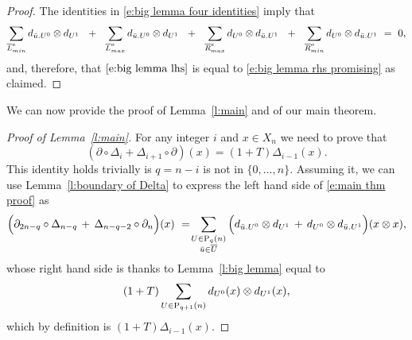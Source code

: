 \begin{proof}
	The identities in \eqref{e:big lemma four identities} imply that
	\begin{equation} \label{e:big lemma zero sum}
	\sum_{\overline{L}_{min}^{e}} d_{\bu.U^0} \otimes d_{U^1}\ \ +\ \
	\sum_{\overline{L}_{max}^{o}} d_{\bu.U^0} \otimes d_{U^1}\ \ +\ \
	\sum_{\overline{R}_{max}^{e}} d_{U^0} \otimes d_{\bu.U^1}\ \ +\ \ 
	\sum_{\overline{R}_{min}^{o}} d_{U^0} \otimes d_{\bu.U^1}\ =\ 0,
	\end{equation}
	and, therefore, that $\eqref{e:big lemma lhs}$ is equal to \eqref{e:big lemma rhs promising} as claimed.
\end{proof}

We can now provide the proof of Lemma~\ref{l:main} and of our main theorem.

\begin{proof}[Proof of Lemma~\ref{l:main}]
	For any integer $i$ and $x \in X_n$ we need to prove that
	\begin{equation} \label{e:main thm proof}
	(\partial \circ \Delta_{i} + \Delta_{i+1} \circ \partial)(x) = (1 + T) \Delta_{i-1}(x).
	\end{equation}
	This identity holds trivially is $q = n-i$ is not in $\{0, \dots, n\}$.
	Assuming it, we can use Lemma~\ref{l:boundary of Delta} to express the left hand side of \eqref{e:main thm proof} as
	\begin{equation*}
	\Big( \partial_{2n-q} \circ \Delta_{n - q} \, +\, \Delta_{n-q-2} \circ \partial_n \Big) (x) \ = \! 
	\sum_{\substack{U \in \P_{q}(n) \\ \bu \in \overline{U}}} \Big( d_{\bu.U^0} \otimes d_{U^1} \, + \, d_{U^0} \otimes d_{\bu.U^1} \Big) (x \otimes x),
	\end{equation*}
	whose right hand side is thanks to Lemma~\ref{l:big lemma} equal to
	\begin{equation*}
	(1+T) \sum_{U \in \P_{q+1}(n)} d_{U^0}(x) \otimes d_{U^1}(x),
	\end{equation*}
	which by definition is $(1+T)\Delta_{i-1}(x)$.
\end{proof}